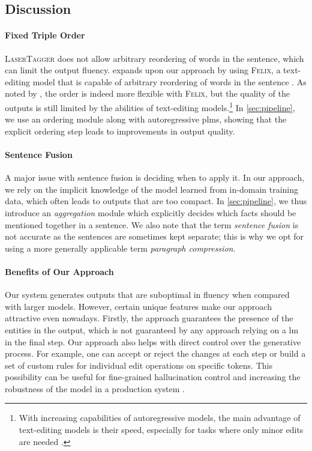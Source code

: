 \subsection{Discussion}

\paragraph{Fixed Triple Order} \textsc{LaserTagger} does not allow arbitrary reordering of words in the sentence, which can limit the output fluency. \citet{grajcar2023data} expands upon our approach by using \textsc{Felix}, a text-editing model that is capable of arbitrary reordering of words in the sentence \cite{mallinsonFelixFlexibleText2020}. As noted by \citet{grajcar2023data}, the order is indeed more flexible with \textsc{Felix}, but the quality of the outputs is still limited by the abilities of text-editing models.\footnote{With increasing capabilities of autoregressive models, the main advantage of text-editing models is their speed, especially for tasks where only minor edits are needed \cite{malmi2022text}.} In \autoref{sec:pipeline}, we use an ordering module along with autoregressive \acp{plm}, showing that the explicit ordering step leads to improvements in output quality.

\paragraph{Sentence Fusion} A major issue with sentence fusion is deciding when to apply it. In our approach, we rely on the implicit knowledge of the model learned from in-domain training data, which often leads to outputs that are too compact. In \autoref{sec:pipeline}, we thus introduce an \emph{aggregation} module which explicitly decides which facts should be mentioned together in a sentence. We also note that the term \emph{sentence fusion} is not accurate as the sentences are sometimes kept separate; this is why we opt for using a more generally applicable term \emph{paragraph compression}.


\paragraph{Benefits of Our Approach} Our system generates outputs that are suboptimal in fluency when compared with larger models. However, certain unique features make our approach attractive even nowadays. Firstly, the approach guarantees the presence of the entities in the output, which is not guaranteed by any approach relying on a \ac{lm} in the final step. Our approach also helps with direct control over the generative process. For example, one can accept or reject the changes at each step or build a set of custom rules for individual edit operations on specific tokens. This possibility can be useful for fine-grained hallucination control \cite{rebuffel2021controlling,chen2023converge} and increasing the robustness of the model in a production system \cite{heidari2021getting,wang2023interactive}.




